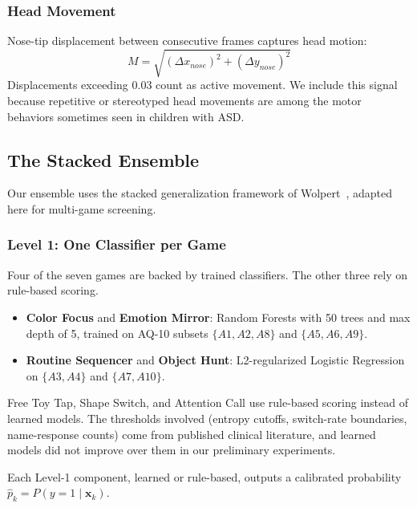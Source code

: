 \documentclass[conference]{IEEEtran}
\begin{document}
\subsubsection{Head Movement}
Nose-tip displacement between consecutive frames captures head motion:
\begin{equation}
M = \sqrt{(\Delta x_{nose})^2 + (\Delta y_{nose})^2}
\label{eq:movement}
\end{equation}
Displacements exceeding 0.03 count as active movement. We include this signal because repetitive or stereotyped head movements are among the motor behaviors sometimes seen in children with ASD.

\subsection{The Stacked Ensemble}

Our ensemble uses the stacked generalization framework of Wolpert~\cite{wolpert1992stacked}, adapted here for multi-game screening.

\subsubsection{Level 1: One Classifier per Game}
Four of the seven games are backed by trained classifiers. The other three rely on rule-based scoring.

\begin{itemize}
    \item \textbf{Color Focus} and \textbf{Emotion Mirror}: Random Forests with 50 trees and max depth of 5, trained on AQ-10 subsets $\{A1, A2, A8\}$ and $\{A5, A6, A9\}$.
    \item \textbf{Routine Sequencer} and \textbf{Object Hunt}: L2-regularized Logistic Regression on $\{A3, A4\}$ and $\{A7, A10\}$.
\end{itemize}

Free Toy Tap, Shape Switch, and Attention Call use rule-based scoring instead of learned models. The thresholds involved (entropy cutoffs, switch-rate boundaries, name-response counts) come from published clinical literature, and learned models did not improve over them in our preliminary experiments.

Each Level-1 component, learned or rule-based, outputs a calibrated probability $\hat{p}_k = P(y{=}1 \mid \mathbf{x}_k)$.
\end{document}
